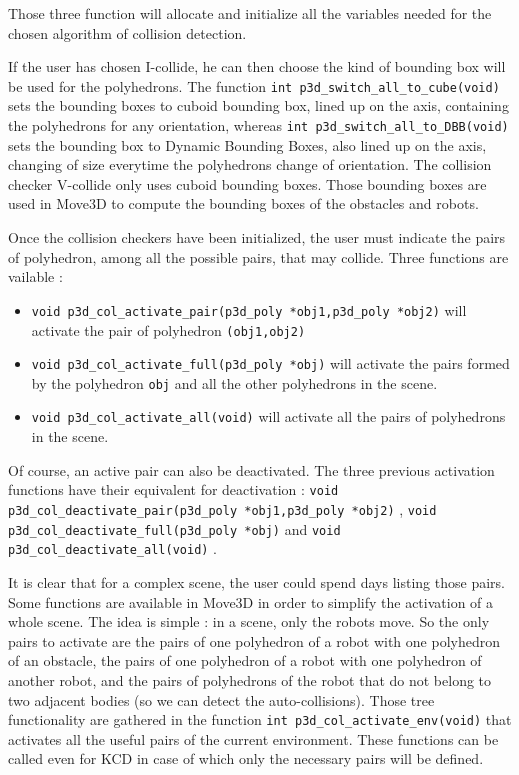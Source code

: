 Those three function will allocate and initialize all the variables
needed for the chosen algorithm of collision detection.

If the user has chosen I-collide, he can then choose the kind of
bounding box will be used for the polyhedrons. The function {\tt int
p3d\_switch\_all\_to\_cube(void)} 
sets the bounding boxes to cuboid bounding box, lined up on the axis,
containing the polyhedrons for any orientation, whereas {\tt int
p3d\_switch\_all\_to\_DBB(void)}  sets the bounding box to Dynamic
Bounding Boxes, also lined up on the axis, changing of size
everytime the polyhedrons change of orientation. The collision checker
V-collide only uses cuboid bounding boxes. Those bounding boxes are
used in Move3D to compute the bounding boxes of the obstacles and robots.

Once the collision checkers have been initialized, the user must
indicate the pairs of polyhedron, among all the possible pairs, that
may collide. Three functions are vailable :

\begin{itemize}
\item {\tt void p3d\_col\_activate\_pair(p3d\_poly *obj1,p3d\_poly
*obj2)}  will activate the pair of polyhedron {\tt (obj1,obj2)}
\item {\tt void p3d\_col\_activate\_full(p3d\_poly *obj)}
 will activate
the pairs formed by the polyhedron {\tt obj} and all the other
polyhedrons in the scene.
\item {\tt void p3d\_col\_activate\_all(void)}
 will activate all the
pairs of polyhedrons in the scene.
\end{itemize}

Of course, an active pair can also be deactivated. The three previous
activation functions have their equivalent for deactivation : \newline
{\tt void p3d\_col\_deactivate\_pair(p3d\_poly *obj1,p3d\_poly *obj2)}
, 
{\tt void p3d\_col\_deactivate\_full(p3d\_poly *obj)}
 and 
{\tt void p3d\_col\_deactivate\_all(void)}
.

It is clear that for a complex scene, the user could spend days
listing those pairs. Some functions are available in Move3D in order to
simplify the activation of a whole scene. The idea is simple : in a
scene, only the robots move. So the only pairs to activate are the
pairs of one polyhedron of a robot with one polyhedron of an
obstacle, the pairs of one polyhedron of a robot with one polyhedron
of another robot, and the pairs of polyhedrons of the robot that do
not belong to two adjacent bodies (so we can detect the auto-collisions).
Those tree functionality are gathered in the function {\tt int
p3d\_col\_activate\_env(void)}  that
activates all the useful pairs of the current environment. 
These functions can be called even for KCD in case of which only the
necessary pairs will be defined.

